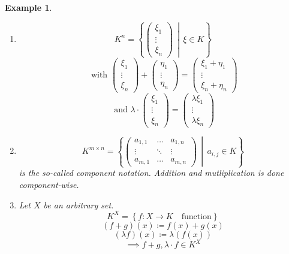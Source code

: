 \documentclass[a4paper,landscape,twocolumn]{article}
\newcommand\set[1]{\left\{#1\right\}}
\newcommand\setdef[2]{\left\{#1\,\middle|\,#2\right\}}
\newtheorem{ex}{Example}[section]
\begin{document}
\begin{ex}
  \begin{enumerate}
    \item
      \[ K^n = \setdef{\begin{pmatrix} \xi_1 \\ \vdots \\ \xi_n \end{pmatrix}}{\xi \in K} \]
      \[
        \text{ with }
        \begin{pmatrix} \xi_1 \\ \vdots \\ \xi_n \end{pmatrix}
        + \begin{pmatrix} \eta_1 \\ \vdots \\ \eta_n \end{pmatrix}
        = \begin{pmatrix} \xi_1 + \eta_1 \\ \vdots \\ \xi_n + \eta_n \end{pmatrix}
      \] \[
        \text{ and }
        \lambda \cdot \begin{pmatrix} \xi_1 \\ \vdots \\ \xi_n \end{pmatrix}
        = \begin{pmatrix} \lambda \xi_1 \\ \vdots \\ \lambda \xi_n \end{pmatrix}
      \]

    \item
      \[
        K^{m\times n} = \setdef{
          \begin{pmatrix}
            a_{1,1} & \ldots & a_{1,n} \\
            \vdots & \ddots & \vdots \\
            a_{m,1} & \ldots & a_{m,n}
          \end{pmatrix}
        }{a_{i,j} \in K}
      \]
      is the so-called component notation. Addition and mutliplication is done
      component-wise.

    \item
      Let $X$ be an arbitrary set.
      \[ K^X = \set{f: X \rightarrow K \quad \text{function}} \]
      \[ (f + g)(x) \coloneqq f(x) + g(x) \]
      \[ (\lambda f)(x) \coloneqq \lambda (f(x)) \]
      \[ \implies f + g, \lambda \cdot f \in K^X \]
  \end{enumerate}
\end{ex}
\end{document}
